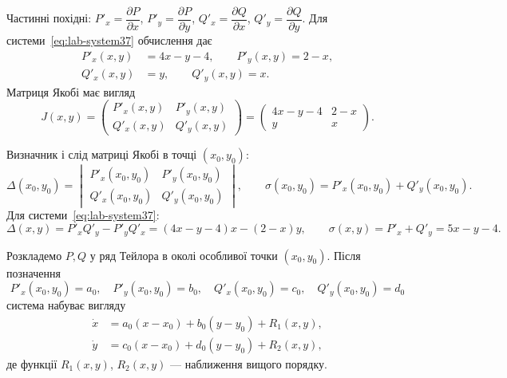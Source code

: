 Частинні похідні:
$P'_x=\dfrac{\partial P}{\partial x}$, $P'_y=\dfrac{\partial P}{\partial y}$,
$Q'_x=\dfrac{\partial Q}{\partial x}$, $Q'_y=\dfrac{\partial Q}{\partial y}$.
Для системи~\eqref{eq:lab-system37} обчислення дає
\begin{align*}
P'_x(x,y) &= 4x-y-4,\qquad P'_y(x,y) = 2-x,\\
Q'_x(x,y) &= y,\qquad Q'_y(x,y) = x.
\end{align*}
Матриця Якобі має вигляд
\begin{equation}\label{eq:lab-jacobian37}
J(x,y)=
\begin{pmatrix}
P'_x(x,y) & P'_y(x,y)\\
Q'_x(x,y) & Q'_y(x,y)
\end{pmatrix}
=
\begin{pmatrix}
4x-y-4 & 2-x\\
y & x
\end{pmatrix}.
\end{equation}

Визначник і слід матриці Якобі в точці $(x_0,y_0)$:
\begin{equation*}
\Delta(x_0,y_0)=
\begin{vmatrix}
P'_x(x_0,y_0) & P'_y(x_0,y_0)\\
Q'_x(x_0,y_0) & Q'_y(x_0,y_0)
\end{vmatrix},
\qquad
\sigma(x_0,y_0)=P'_x(x_0,y_0)+Q'_y(x_0,y_0).
\end{equation*}
Для системи~\eqref{eq:lab-system37}:
\begin{equation*}
\Delta(x,y)=P'_x Q'_y-P'_y Q'_x=(4x-y-4)x-(2-x)y,\qquad
\sigma(x,y)=P'_x+Q'_y=5x-y-4.
\end{equation*}

Розкладемо $P,Q$ у ряд Тейлора в околі особливої точки $(x_0,y_0)$. Після позначення
\begin{equation*}
P'_x(x_0,y_0)=a_0,\quad P'_y(x_0,y_0)=b_0,\quad Q'_x(x_0,y_0)=c_0,\quad Q'_y(x_0,y_0)=d_0
\end{equation*}
система набуває вигляду
\begin{equation*}
\begin{aligned}
\dot{x} &= a_0(x-x_0)+b_0(y-y_0)+R_1(x,y),\\
\dot{y} &= c_0(x-x_0)+d_0(y-y_0)+R_2(x,y),
\end{aligned}
\end{equation*}
де функції $R_1(x,y)$, $R_2(x,y)$ --- наближення вищого порядку.

